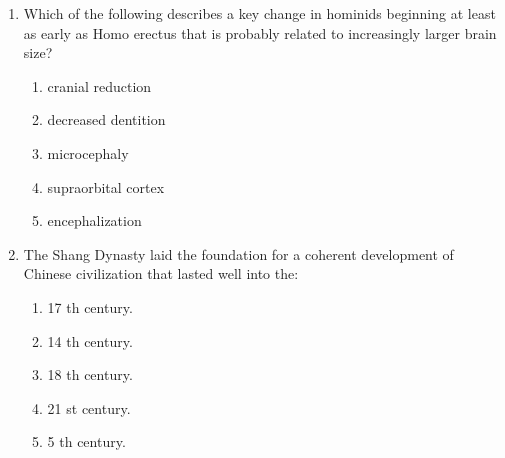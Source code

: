 \documentclass[12pt]{article}
\begin{document}
\begin{enumerate}[label=\arabic*.]
\begin{enumerate}[label=(\alph*)]
    \item an osteological comparative collection from a site.
\end{enumerate}
\item Which of the following describes a key change in hominids beginning at least as early as Homo erectus that is probably related to increasingly larger brain size?
\begin{enumerate}[label=(\alph*)]
    \item cranial reduction
    \item decreased dentition
    \item microcephaly
    \item supraorbital cortex
    \item encephalization
\end{enumerate}
\item The Shang Dynasty laid the foundation for a coherent development of Chinese civilization that lasted well into the:
\begin{enumerate}[label=(\alph*)]
    \item 17 th century.
    \item 14 th century.
    \item 18 th century.
    \item 21 st century.
    \item 5 th century.
\end{enumerate}
\end{enumerate}
\end{document}
